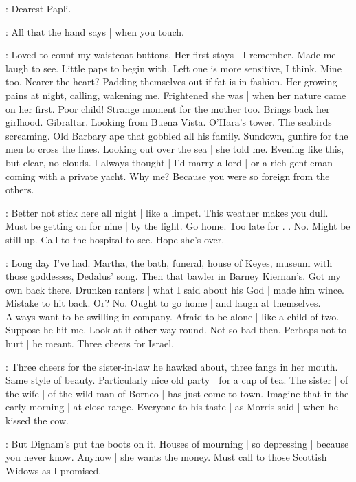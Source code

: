 \BloomToday:
Dearest Papli.

\BloomAbstract:
All that the hand says |
when you touch.

\BloomHist:
Loved to count my waistcoat buttons.
Her first stays |
I remember.
Made me laugh to see.
Little paps to begin with.%
Left one is more sensitive,
I think.
Mine too.
Nearer the heart?
Padding themselves out
if fat is in fashion.
Her growing pains at night,
calling,
wakening me.
Frightened she was |
when her nature came on her first.
Poor child!
Strange moment for the mother too.
Brings back her girlhood.
Gibraltar.
Looking from Buena Vista.
O'Hara's tower.
The seabirds screaming.
Old Barbary ape that gobbled all his family.
Sundown,
gunfire for the men to cross the lines.
Looking out over the sea |
she told me.
Evening like this,
but clear,
no clouds.
I always thought |
I'd marry a lord |
or a rich gentleman coming with a private yacht.
Why me?
Because you were so foreign
from the others.

\BloomCurrent:
Better not stick here all night |
like a limpet.
This weather makes you dull.
Must be getting on for nine |
by the light.
Go home.
Too late for .
.
No.
Might be still up.
Call to the hospital to see.
Hope she's over.

\BloomToday:
Long day I've had.
Martha,
the bath,
funeral,
house of Keyes,
museum with those goddesses,
Dedalus' song.
Then that bawler in Barney Kiernan's.
Got my own back there.
Drunken ranters |
what I said about his God |
made him wince.
Mistake to hit back.
Or?
No.
Ought to go home |
and laugh at themselves.
Always want to be swilling in company.
Afraid to be alone |
like a child of two.
Suppose he hit me.
Look at it other way round.
Not so bad then.
Perhaps not to hurt |
he meant.%
Three cheers for Israel.

\BloomAbstract:
Three cheers for the sister-in-law he hawked about,
three fangs in her mouth.
Same style of beauty.
Particularly nice old party |
for a cup of tea.
The sister |
of the wife |
of the wild man of Borneo |
has just come to town.
Imagine that in the early morning |
at close range.
Everyone to his taste |
as Morris said |
when he kissed the cow.

\BloomToday:
But Dignam's put the boots on it.
Houses of mourning |
so depressing |
because you never know.
Anyhow |
she wants the money.
Must call to those Scottish Widows
as I promised.

